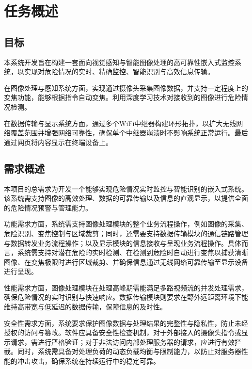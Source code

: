 \chapter{任务概述}

\section{目标}

本系统开发旨在构建一套面向视觉感知与智能图像处理的高可靠性嵌入式监控系统，以实现对危险情况的实时、精确监控、智能识别与高效信息传输。

在图像处理与感知系统方面，实现通过摄像头采集图像数据，并支持一定程度上的变焦功能，能够根据指令自动变焦。利用深度学习技术对接收到的图像进行危险情况检测。

在数据传输与显示系统方面，通过多个WiFi中继器构建环形拓扑，以扩大无线网络覆盖范围并增强网络可靠性，确保单个中继器崩溃时不影响系统正常运行。最后通过网页将内容显示在终端设备上。

\section{需求概述}

本项目的总需求为开发一个能够实现危险情况实时监控与智能识别的嵌入式系统。该系统需支持图像的高效处理、数据的可靠传输以及信息的直观显示，以提供全面的危险情况预警与管理能力。

功能需求方面，系统需支持图像处理模块的整个业务流程操作，例如图像的采集、危险识别、变焦控制与区域裁剪；同时，还需要支持数据传输模块的通信链路管理与数据转发业务流程操作；以及显示模块的信息接收与呈现业务流程操作。具体而言，系统需支持对潜在危险的实时检测、在检测到危险时自动进行变焦以捕获清晰图像、在变焦极限时进行区域裁剪、并确保信息通过无线网络可靠传输至显示设备进行呈现。

性能需求方面，图像处理模块在处理高峰期需能满足多路视频流的并发处理需求，确保危险情况的实时识别与快速响应。数据传输模块则要求在野外远距离环境下能维持高带宽与低延迟的数据传输，保障信息的及时性。

安全性需求方面，系统要求保护图像数据与处理结果的完整性与隐私性，防止未经授权的访问与篡改。软件应具备安全性检查机制，对于外部接入的摄像头指令或显示请求，需进行严格验证；对于非法访问内部处理服务器的请求，应进行有效拦截。同时，系统需具备对处理负荷的动态负载均衡与限制能力，以防止对服务器性能的冲击攻击，确保系统在持续运行中的稳定可靠。